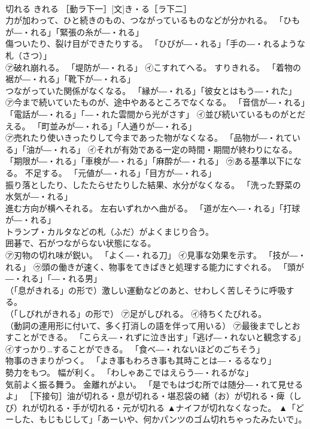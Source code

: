 \documentclass[8pt]{extreport}
\begin{document}
\begin{CJK}{UTF8}{min}
\\	切れる	きれる	［動ラ下一］[文]き・る［ラ下二］ 
\\	力が加わって、ひと続きのもの、つながっているものなどが分かれる。 「ひもが―・れる」「緊張の糸が―・れる」 
\\	傷ついたり、裂け目ができたりする。 「ひびが―・れる」「手の―・れるような札（さつ）」 
\\	㋐破れ崩れる。 「堤防が―・れる」 ㋑こすれてへる。 すりきれる。 「着物の裾が―・れる」「靴下が―・れる」 
\\	つながっていた関係がなくなる。 「縁が―・れる」「彼女とはもう―・れた」 
\\	㋐今まで続いていたものが、途中やあるところでなくなる。 「音信が―・れる」「電話が―・れる」「―・れた雲間から光がさす」 ㋑並び続いているものがとだえる。 「町並みが―・れる」「人通りが―・れる」 
\\	㋐売れたり使いきったりして今まであった物がなくなる。 「品物が―・れている」「油が―・れる」 ㋑それが有効である一定の時間・期間が終わりになる。 「期限が―・れる」「車検が―・れる」「麻酔が―・れる」 ㋒ある基準以下になる。 不足する。 「元値が―・れる」「目方が―・れる」 
\\	振り落としたり、したたらせたりした結果、水分がなくなる。 「洗った野菜の水気が―・れる」 
\\	進む方向が横へそれる。 左右いずれかへ曲がる。 「道が左へ―・れる」「打球が―・れる」 
\\	トランプ・カルタなどの札（ふだ）がよくまじり合う。 
\\	囲碁で、石がつながらない状態になる。 
\\	㋐刃物の切れ味が鋭い。 「よく―・れる刀」 ㋑見事な効果を示す。 「技が―・れる」 ㋒頭の働きが速く、物事をてきぱきと処理する能力にすぐれる。 「頭が―・れる」「―・れる男」 
\\	（「息がきれる」の形で）激しい運動などのあと、せわしく苦しそうに呼吸する。 
\\	（「しびれがきれる」の形で） ㋐足がしびれる。 ㋑待ちくたびれる。 
\\	（動詞の連用形に付いて、多く打消しの語を伴って用いる） ㋐最後までしとおすことができる。 「こらえ―・れずに泣き出す」「逃げ―・れないと観念する」 ㋑すっかり…することができる。 「食べ―・れないほどのごちそう」 
\\	物事のきまりがつく。 「よき事もわろき事も其時ことは―・るるなり」 
\\	勢力をもつ。 幅が利く。 「わしゃあこではえらう―・れるがな」 
\\	気前よく振る舞う。 金離れがよい。 「是でもはづむ所では随分―・れて見せるよ」 ［下接句］油が切れる・息が切れる・堪忍袋の緒（お）が切れる・痺（しび）れが切れる・手が切れる・元が切れる	▲ナイフが切れなくなった。 ▲「どーした、もじもじして」「あーいや、何かパンツのゴム切れちゃったみたいで」。

\end{CJK}
\end{document}
